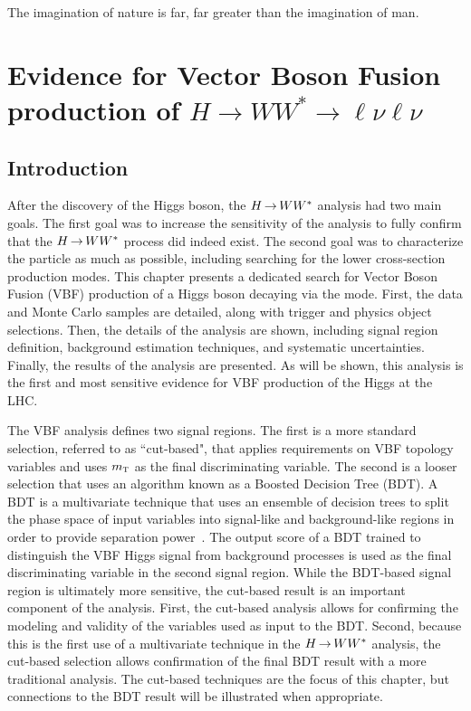 \begin{savequote}[75mm]
The imagination of nature is far, far greater than the imagination of man.
\end{savequote}

\chapter{Evidence for Vector Boson Fusion production of $H\rightarrow WW^{*}\rightarrow \ell\nu\ell\nu$}

\section{Introduction}

After the discovery of the Higgs boson, the $H{\,{\rightarrow}\,}WW^\ast$ analysis had two main goals. The first goal was to increase the sensitivity of the analysis to fully confirm that the $H{\,{\rightarrow}\,}WW^\ast$ process did indeed exist. The second goal was to characterize the particle as much as possible, including searching for the lower cross-section production modes.  This chapter presents a dedicated search for Vector Boson Fusion (VBF) production of a Higgs boson decaying via the \HWWfull mode. First, the data and Monte Carlo samples are detailed, along with trigger and physics object selections. Then, the details of the analysis are shown, including signal region definition, background estimation techniques, and systematic uncertainties. Finally, the results of the analysis are presented. As will be shown, this analysis is the first and most sensitive evidence for VBF production of the Higgs at the LHC.

The VBF \HWWfull analysis defines two signal regions. The first is a more standard selection, referred to as ``cut-based", that applies requirements on  VBF topology variables and uses $m_{\textrm{\footnotesize\sc t}}$ as the final discriminating variable. The second is a looser selection that uses an algorithm known as a Boosted Decision Tree (BDT). A BDT is a multivariate technique that uses an ensemble of decision trees to split the phase space of input variables into signal-like and background-like regions in order to provide separation power~\cite{BDT1,BDT2,BDT3}. The output score of a BDT trained to distinguish the VBF Higgs signal from background processes is used as the final discriminating variable in the second signal region. While the BDT-based signal region is ultimately more sensitive, the cut-based result is an important component of the analysis. First, the cut-based analysis allows for confirming the modeling and validity of the variables used as input to the BDT. Second, because this is the first use of a multivariate technique in the $H{\,{\rightarrow}\,}WW^\ast$ analysis, the cut-based selection allows confirmation of the final BDT result with a more traditional analysis. The cut-based techniques are the focus of this chapter, but connections to the BDT result will be illustrated when appropriate. 

